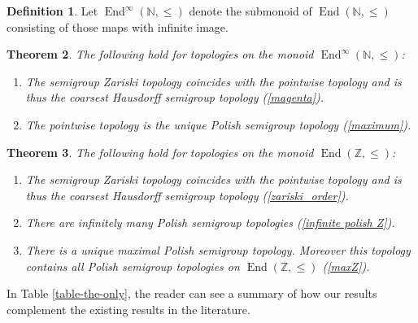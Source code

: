 \documentclass[11pt]{amsart}
\newtheorem{theorem}{Theorem}[section]
\theoremstyle{definition}
\newtheorem{definition}[theorem]{Definition}
\newcommand{\N}{\mathbb N}
\newcommand{\Enddi}{\operatorname{End}^{\infty}(\mathbb N, \leq)}
\newcommand{\Z}{\mathbb Z}
\begin{document}
\begin{definition}
  Let $\operatorname{End}^\infty(\N,\leq)$ denote the submonoid of $\operatorname{End}(\N,\leq)$ consisting of those maps with infinite image.   
\end{definition}



\begin{theorem}\label{thm:endNi}
The following hold for topologies on the monoid \(\Enddi\):
\begin{enumerate}[\rm(1)]
    \item The semigroup Zariski topology coincides with the pointwise topology and is thus the coarsest Hausdorff semigroup topology (\cref{magenta}).
    \item The pointwise topology is the unique Polish semigroup topology (\cref{maximum}).
\end{enumerate}
\end{theorem}



\begin{theorem}\label{thm:endZ}
The following hold for topologies on the monoid \(\operatorname{End}(\Z, \leq)\):
\begin{enumerate}[\rm(1)]
    \item The semigroup Zariski topology coincides with the pointwise topology and is thus the coarsest Hausdorff semigroup topology (\cref{zariski_order}).
    \item There are infinitely many Polish semigroup topologies (\cref{infinite polish Z}).
    \item There is a unique maximal Polish semigroup topology. Moreover this topology contains all Polish semigroup topologies on \(\operatorname{End}(\Z, \leq)\) (\cref{maxZ}).
\end{enumerate}
\end{theorem}


In Table \ref{table-the-only}, the reader can see a summary of how our results complement the existing results in the literature.



\end{document}
